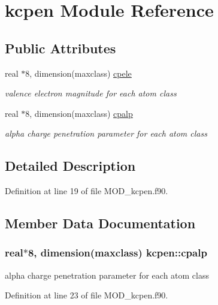 \hypertarget{classkcpen}{\section{kcpen Module Reference}
\label{classkcpen}
}
\subsection*{Public Attributes}
\begin{DoxyCompactItemize}
\item 
real $\ast$8, dimension(maxclass) \hyperlink{classkcpen_a6814a7cf39d646c28f4993dfec05556f}{cpele}
\begin{DoxyCompactList}\small\item\em valence electron magnitude for each atom class \end{DoxyCompactList}\item 
real $\ast$8, dimension(maxclass) \hyperlink{classkcpen_a8f4a8ca8d5cefaf578dca21e941db54f}{cpalp}
\begin{DoxyCompactList}\small\item\em alpha charge penetration parameter for each atom class \end{DoxyCompactList}\end{DoxyCompactItemize}


\subsection{Detailed Description}


Definition at line 19 of file M\-O\-D\-\_\-kcpen.\-f90.



\subsection{Member Data Documentation}
\hypertarget{classkcpen_a8f4a8ca8d5cefaf578dca21e941db54f}{
\subsubsection[{cpalp}]{\setlength{\rightskip}{0pt plus 5cm}real$\ast$8, dimension(maxclass) kcpen\-::cpalp}}\label{classkcpen_a8f4a8ca8d5cefaf578dca21e941db54f}


alpha charge penetration parameter for each atom class 



Definition at line 23 of file M\-O\-D\-\_\-kcpen.\-f90.

